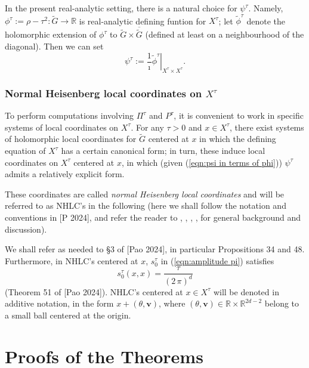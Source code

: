 \documentclass[12pt,a4paper]{article}
\theoremstyle{plain}
\theoremstyle{definition}
\begin{document}
In the present real-analytic
setting, 
there is a natural choice for $\psi^\tau$.
Namely, $\phi^\tau:=\rho-\tau^2:\tilde{G}\rightarrow \mathbb{R}$ is 
real-analytic defining funtion for $X^\tau$; let $\tilde{\phi}^\tau$
denote the holomorphic extension of $\phi^\tau$ to
$\tilde{G}\times \overline{\tilde{G}}$ (defined at least on 
a neighbourhood of the diagonal). Then we can set
\begin{equation}
\label{eqn:psi in terms of phi}
\psi^\tau:=\frac{1}{\imath}\left.\tilde{\phi}^\tau
\right|_{X^\tau\times X^\tau}.
\end{equation}




\subsubsection{Normal Heisenberg local coordinates on $X^\tau$}
\label{scnt:heis coord}

To perform computations involving $\Pi^\tau$ and $P^\tau$,
it is convenient to work in specific systems 
of local coordinates on $X^\tau$.
For any $\tau>0$ and $x\in X^\tau$, there exist systems of holomorphic
local coordinates for $\tilde{G}$ centered at $x$ in which the defining
equation of $X^\tau$ has a certain canonical form;
in turn, these induce local coordinates on $X^\tau$ centered at
$x$, in which (given (\ref{eqn:psi in terms of phi}))
$\psi^\tau$ admits a relatively explicit form.

These coordinates are called \textit{normal Heisenberg local coordinates}
and will be referred to as NHLC's in the following
(here we shall follow the notation and conventions in [P 2024],
and refer the
reader to \cite{fs1}, \cite{fs2}, \cite{cr1}, \cite{cr2}, \cite{sz}
for general background and discussion). 

We shall refer as needed to \S 3 of [Pao 2024], in particular Propositions 34 and 48. Furthermore, in NHLC's centered at $x$, $s_0^\tau$ in
(\ref{eqn:amplitude pi}) satisfies
\begin{equation}
\label{eqn:valore s0 xx}
s_0^\tau(x,x)=\frac{\tau}{(2\,\pi)^d}
\end{equation}
%
(Theorem 51 of [Pao 2024]).
NHLC's centered at $x\in X^\tau$ will be 
denoted in additive notation, in the form
$x+(\theta,\mathbf{v})$, where $(\theta,\mathbf{v})\in \mathbb{R}\times \mathbb{R}^{2d-2}$ belong to a small ball centered at the origin.


\section{Proofs of the Theorems}
\end{document}
